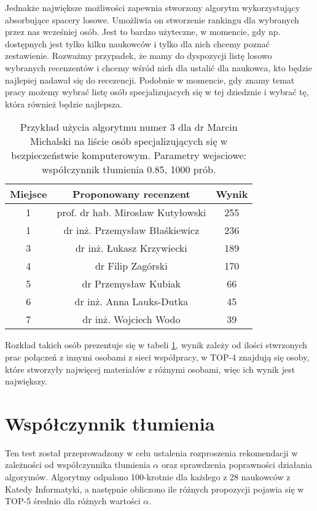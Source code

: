 Jednakże największe możliwości zapewnia stworzony algorytm wykorzystujący absorbujące spacery losowe. Umożliwia on stworzenie rankingu dla wybranych przez nas wcześniej osób. Jest to bardzo użyteczne, w momencie, gdy np. dostępnych jest tylko kilku naukowców i tylko dla nich chcemy poznać zestawienie. Rozważmy przypadek, że mamy do dyspozycji listę losowo wybranych recenzentów i chcemy wśród nich dla ustalić dla naukowca, kto będzie najlepiej nadawał się do recezencji. Podobnie w momencie, gdy znamy temat pracy możemy wybrać listę osób specjalizujacych się w tej dziedznie i wybrać tę, która również będzie najlepsza.


\begin{table}[h]
        \centering
\begin{tabular}{c|c|c}
Miejsce  & Proponowany recenzent & Wynik \\  \hline
1&prof. dr hab. Mirosław Kutyłowski &255 \\
1&dr inż. Przemysław Błaśkiewicz&236 \\
3&dr inż. Łukasz Krzywiecki &189 \\
4&dr Filip Zagórski&170 \\
5&dr Przemysław Kubiak& 66 \\
6&dr inż. Anna Lauks-Dutka& 45 \\
7&dr inż. Wojciech Wodo& 39 \\

\end{tabular}
\caption{Przykład użycia algorytmu numer 3 dla dr Marcin Michalski na liście osób specjalizujących się w bezpieczeństwie komputerowym. Parametry wejsciowe: współczynnik tłumienia 0.85, 1000 prób.}
\label{table:4}
\end{table}

Rozkład takich osób prezentuje się w tabeli \ref{table:4}, wynik zależy od ilości stwrzonych prac połączeń z innymi osobami z sieci współpracy, w TOP-4 znajdują się osoby, które stworzyły najwięcej materiałów z różnymi osobami, więc ich wynik jest największy.


\section{Współczynnik tłumienia}


Ten test został przeprowadzony w celu ustalenia rozproszenia rekomendacji w zależności od współczynnika tłumienia $\alpha$ oraz sprawdzenia poprawności działania algorymów. Algorytmy odpalono 100-krotnie dla każdego z 28 naukowców z Katedy Informatyki, a następnie obliczono ile różnych propozycji pojawia się w TOP-5 średnio dla różnych wartości $\alpha$.

